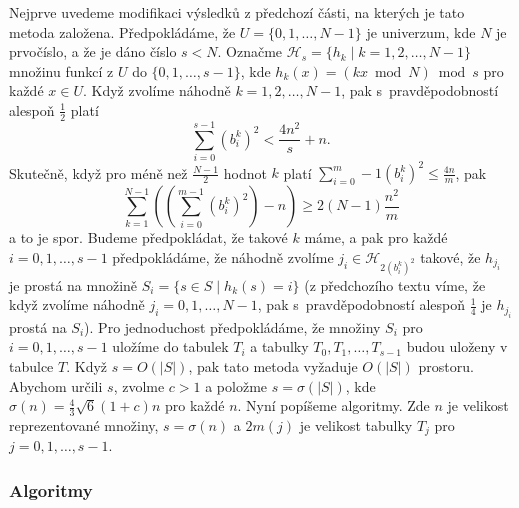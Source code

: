 \documentclass[a4paper,12pt]{article}
\begin{document}
Nejprve uvedeme modifikaci výsledků z 
předchozí části, na kterých je tato metoda založena.
Předpokládáme, že $U=\{0,1,\dots,N-1\}$ je univerzum, kde $
N$ je 
prvočíslo, a že je dáno číslo $s<N$. Označme 
$\mathcal H_s=\{h_k\mid k=1,2,\dots,N-1\}$ množinu funkcí z $U$ do 
$\{0,1,\dots,s-1\}$, kde $h_k(x)=(kx\bmod N)\bmod s$ pro každé $
x\in U$. 
Když zvolíme náhodně $k=1,2,\dots,N-1$, pak s~pravděpodobností 
ales\-poň $\frac 12$ platí 
$$\sum_{i=0}^{s-1}(b_i^k)^2<\frac {4n^2}s+n.$$
Skutečně, když pro méně než $\frac{N-1}2$ hodnot $k$ platí $\sum_{i=0}^m-1(b^k_i)^2\le\frac{4n}m$, pak 
$$\sum_{k=1}^{N-1}\left((\sum_{i=0}^{m-1}(b^k_i)^2)-n\right)\ge2(N-1)\frac{n^2}m$$ 
a to je spor. Budeme předpokládat, 
že takové $k$ máme, a pak pro každé $i=0,1,\dots,s-1$ 
předpokládáme, že náhodně zvolíme $j_i\in \mathcal H_{
2(b_i^k)^2}$ takové, že 
$h_{j_i}$ je prostá na množině $S_i=\{s\in S\mid h_k(s)=i
\}$ (z předchozího textu víme, že když zvolíme náhodně 
$j_i=0,1,\dots,N-1$, pak s~pravděpodobností ales\-poň $\frac 
14$ je $h_{j_i}$ prostá na $S_i$). Pro jednoduchost předpokládáme, že množiny $
S_i$ 
pro $i=0,1,\dots,s-1$ uložíme do tabulek $T_i$ a tabulky 
$T_0,T_1,\dots,T_{s-1}$ budou uloženy v tabulce $T$. Když $
s=O(|S|)$, 
pak tato metoda vyžaduje $O(|S|)$ prostoru. Abychom určili $
s$, 
zvolme $c>1$ a položme $s=\sigma (|S|)$, kde $\sigma (n)=\frac 
43\sqrt 6(1+c)n$ pro 
každé $n$. Nyní popíšeme algoritmy. Zde $n$ je velikost reprezentované množiny, $s=\sigma(n)$ a $2m(j)$ je velikost tabulky $T_j$ pro $j=0,1,\dots,s-1$.

\subsubsection{Algoritmy}
\end{document}
